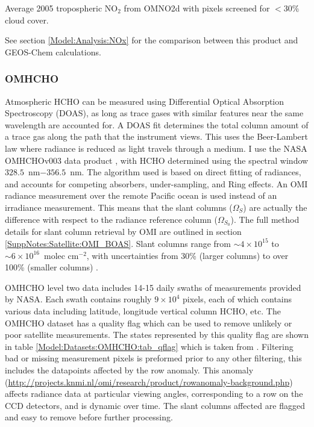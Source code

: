       
        {Average 2005 tropospheric NO$_2$ from OMNO2d with pixels screened for $<30\%$ cloud cover.}
        {\label{Model:Datasets:OMNO2d:fig_omno2d_2005}}
      
      See section \ref{Model:Analysis:NOx} for the comparison between this product and GEOS-Chem calculations.
    
    \subsubsection{OMHCHO}
      \label{Model:Datasets:OMHCHO}
      
      Atmospheric HCHO can be measured using Differential Optical Absorption Spectroscopy (DOAS), as long as trace gases with similar features near the same wavelength are accounted for.
      A DOAS fit determines the total column amount of a trace gas along the path that the instrument views.
      This uses the Beer-Lambert law where radiance is reduced as light travels through a medium.
      I use the NASA OMHCHOv003 data product \parencite{Abad2015}, with HCHO determined using the spectral window $328.5$~nm$ - 356.5$~nm. 
      The algorithm used is based on direct fitting of radiances, and accounts for competing absorbers, under-sampling, and Ring effects.
      An OMI radiance measurement over the remote Pacific ocean is used instead of an irradiance measurement.
      This means that the slant columns ($\Omega_S$) are actually the difference with respect to the radiance reference column ($\Omega_{S_0}$).
      The full method details for slant column retrieval by OMI are outlined in section \ref{SuppNotes:Satellite:OMI_BOAS}.
      Slant columns range from $\sim 4\times 10^{15} $ to $\sim 6 \times 10^{16}$~molec cm$^{-2}$, with uncertainties from 30\% (larger columns) to over 100\% (smaller columns) \parencite{Abad2015}.
      
      
      OMHCHO level two data includes 14-15 daily swaths of measurements provided by NASA.
      Each swath contains roughly $9 \times 10^4$ pixels, each of which contains various data including latitude, longitude vertical column HCHO, etc.
      The OMHCHO dataset has a quality flag which can be used to remove unlikely or poor satellite measurements.
      The states represented by this quality flag are shown in table \ref{Model:Datasets:OMHCHO:tab_qflag} which is taken from \textcite{Kurosu2014}.
      Filtering bad or missing measurement pixels is preformed prior to any other filtering, this includes the datapoints affected by the row anomaly.
      This anomaly (\url{http://projects.knmi.nl/omi/research/product/rowanomaly-background.php}) affects radiance data at particular viewing angles, corresponding to a row on the CCD detectors, and is dynamic over time.
      The slant columns affected are flagged and easy to remove before further processing.
      
